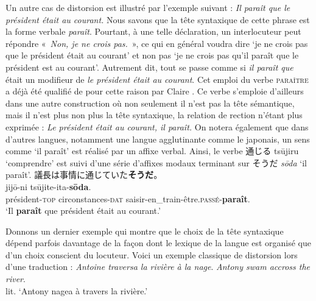 {    Un autre cas de distorsion est illustré par l’exemple suivant :
    \ea
    \textit{{Il paraît que le président était au courant.}}
    \z
    Nous savons que la tête syntaxique de cette phrase est la forme verbale \textit{paraît}. Pourtant, à une telle déclaration, un interlocuteur peut répondre «~\textit{Non, je ne crois pas.}~», ce qui en général voudra dire ‘je ne crois pas que le président était au courant’ et non pas ‘je ne crois pas qu’il paraît que le président est au courant’. Autrement dit, tout se passe comme si \textit{il paraît que} était un modifieur de \textit{le président était au courant}. Cet emploi du verbe \textsc{paraître} a déjà été qualifié de  pour cette raison par Claire \citet{blanche-benveniste1989constructions}. Ce verbe s’emploie d’ailleurs dans une autre construction où non seulement il n’est pas la tête sémantique, mais il n’est plus non plus la tête syntaxique, la relation de rection n’étant plus exprimée :
    \ea
    \textit{{Le président était au courant, il paraît.}}
    \z
    On notera également que dans d’autres langues, notamment une langue agglutinante comme le japonais, un sens comme ‘il paraît’ est réalisé par un affixe verbal. Ainsi, le verbe {\cjkfont 通じる} tsūjiru ‘comprendre’ est suivi d’une série d’affixes modaux terminant sur {\cjkfont そうだ} \textit{sōda} ‘il paraît’.
    \ea\relax
    {\cjkfont 議長は事情に通じていた\textbf{そうだ}。}\\
      {jijō-ni}  {tsūjite-ita-\textbf{sōda}}.\\
    président-\textsc{top} circonstances-\textsc{dat} saisir-en_train-être.\textsc{passé}-\textbf{paraît}.\\
    ‘Il \textbf{paraît} que président était au courant.’
    \z

    Donnons un dernier exemple qui montre que le choix de la tête syntaxique dépend parfois davantage de la façon dont le lexique de la langue est organisé que d’un choix conscient du locuteur. Voici un exemple classique de distorsion lors d’une traduction :
    \ea
    \ea\textit{Antoine traversa la rivière à la nage}.\z
    \ex\textit{Antony swam accross the river}.\\
    lit. `Antony nagea à travers la rivière.'\z
    \z

}
